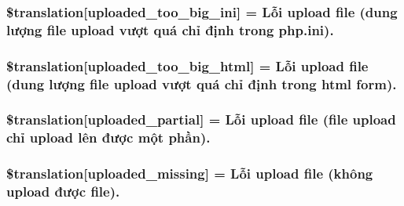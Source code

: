 \subsubsection[{\$translation}]{\setlength{\rightskip}{0pt plus 5cm}\$translation\mbox{[}\textquotesingle{}uploaded\+\_\+too\+\_\+big\+\_\+ini\textquotesingle{}\mbox{]} = \textquotesingle{}Lỗi {\bf upload} file (dung lượng file {\bf upload} vượt quá chỉ định trong php.\+ini).\textquotesingle{}}\label{class_8upload_8vn___v_n_8php_a6a08dcd0d3651fdd098568f6b2f0a42c}
\hypertarget{class_8upload_8vn___v_n_8php_a623d5b8b92169f57d7e43458aa911cbb}{}
\subsubsection[{\$translation}]{\setlength{\rightskip}{0pt plus 5cm}\$translation\mbox{[}\textquotesingle{}uploaded\+\_\+too\+\_\+big\+\_\+html\textquotesingle{}\mbox{]} = \textquotesingle{}Lỗi {\bf upload} file (dung lượng file {\bf upload} vượt quá chỉ định trong html form).\textquotesingle{}}\label{class_8upload_8vn___v_n_8php_a623d5b8b92169f57d7e43458aa911cbb}
\hypertarget{class_8upload_8vn___v_n_8php_a967c17da21b0a2d3bd65cca3a9ca0ea8}{}
\subsubsection[{\$translation}]{\setlength{\rightskip}{0pt plus 5cm}\$translation\mbox{[}\textquotesingle{}uploaded\+\_\+partial\textquotesingle{}\mbox{]} = \textquotesingle{}Lỗi {\bf upload} file (file {\bf upload} chỉ {\bf upload} lên được một phần).\textquotesingle{}}\label{class_8upload_8vn___v_n_8php_a967c17da21b0a2d3bd65cca3a9ca0ea8}
\hypertarget{class_8upload_8vn___v_n_8php_a0cce433260be65f1f35853a6b4b8952b}{}
\subsubsection[{\$translation}]{\setlength{\rightskip}{0pt plus 5cm}\$translation\mbox{[}\textquotesingle{}uploaded\+\_\+missing\textquotesingle{}\mbox{]} = \textquotesingle{}Lỗi {\bf upload} file (không {\bf upload} được file).\textquotesingle{}}\label{class_8upload_8vn___v_n_8php_a0cce433260be65f1f35853a6b4b8952b}
\hypertarget{class_8upload_8vn___v_n_8php_a4a9168e922b827e6a28b5db1c00774ca}{}
